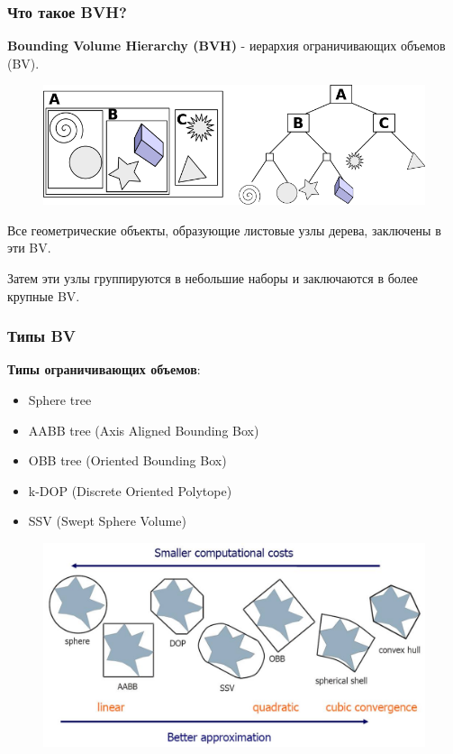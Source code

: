 \documentclass{beamer}
\begin{document}
\begin{frame}
    \frametitle{Что такое BVH?}
    \begin{block}{}
        \textbf{Bounding Volume Hierarchy (BVH)} - иерархия ограничивающих объемов (BV).
    \end{block}
    \begin{figure}
        \includegraphics[keepaspectratio, width=\textwidth]{res/bvh.png}
    \end{figure}
    Все геометрические объекты, образующие листовые узлы дерева, заключены в эти BV.

    Затем эти узлы группируются в небольшие наборы и заключаются в более крупные BV.

\end{frame}

\begin{frame}
    \frametitle{Типы BV}
    \textbf{Типы ограничивающих объемов}:
    \begin{itemize}
        \item
            Sphere tree
        \item
            AABB tree (Axis Aligned Bounding Box)
        \item
            OBB tree (Oriented Bounding Box)
        \item
            k-DOP (Discrete Oriented Polytope)
        \item
            SSV (Swept Sphere Volume)
    \end{itemize}
    \begin{figure}
        \begin{center}
            \includegraphics[keepaspectratio, scale=0.3]{res/bvh_types.jpg}
        \end{center}
    \end{figure}
\end{frame}
\end{document}
